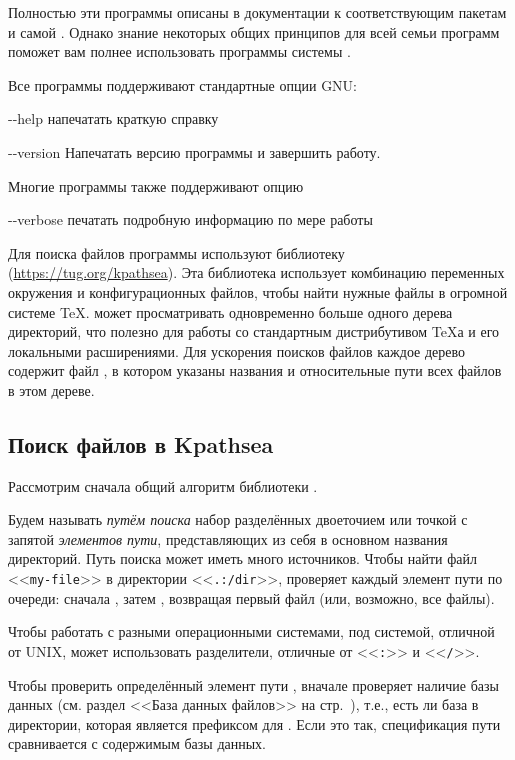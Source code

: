 \documentclass{article}
\renewcommand{\samp}[1]{<<\texttt{#1}>>}
\begin{document}
\noindent Полностью эти программы описаны в документации к
соответствующим пакетам и самой \Webc{}.  Однако знание некоторых
общих принципов для всей семьи программ поможет вам полнее
использовать программы системы  \Webc{}.

Все программы поддерживают стандартные опции GNU:
\begin{ttdescription}
\item[-{}-help] напечатать краткую справку
\item[-{}-version] Напечатать версию программы и завершить работу.
\end{ttdescription}

Многие программы также поддерживают опцию
\begin{ttdescription}
\item[-{}-verbose] печатать подробную информацию по мере работы
\end{ttdescription}

Для поиска файлов программы \Webc{} используют библиотеку \KPS{}
(\url{https://tug.org/kpathsea}). Эта библиотека использует комбинацию
переменных окружения и конфигурационных файлов, чтобы найти нужные
файлы в огромной системе \TeX{}.  \Webc{} может просматривать
одновременно больше одного дерева директорий, что полезно для работы
со стандартным дистрибутивом \TeX{}а и его локальными расширениями.
Для ускорения поисков файлов каждое дерево содержит файл ,
в котором указаны названия и относительные пути всех файлов в этом
дереве.

\subsection{Поиск файлов в Kpathsea}
\label{sec:kpathsea}

Рассмотрим сначала общий алгоритм библиотеки \KPS. 

Будем называть \emph{путём поиска} набор разделённых двоеточием или
точкой с запятой \emph{элементов пути}, представляющих из себя в
основном названия директорий.  Путь поиска может иметь много
источников.  Чтобы найти файл \samp{my-file} в директории
\samp{.:/dir}, \KPS{} проверяет каждый элемент пути по очереди:
сначала , затем , возвращая первый
файл (или, возможно, все файлы).

Чтобы работать с разными операционными системами, \KPS{} под системой,
отличной от UNIX, может использовать разделители, отличные от
\samp{:} и \samp{/}.

Чтобы проверить определённый элемент пути , \KPS{} вначале
проверяет наличие базы данных (см. раздел <<База данных
файлов>> на стр.~\pageref{sec:filename-database}), т.е., есть ли база в
директории, которая является префиксом для .  Если это так,
спецификация пути сравнивается с содержимым базы данных.
\end{document}
